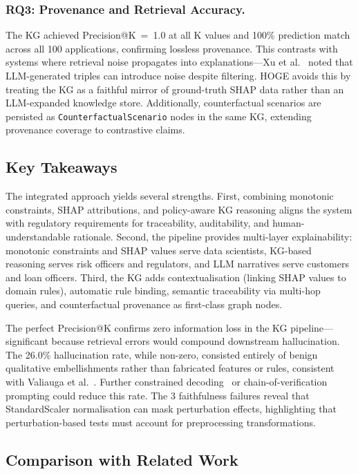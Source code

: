 \documentclass[lnbip]{svmultln}
\begin{document}
\subsubsection{RQ3: Provenance and Retrieval Accuracy.}
The KG achieved Precision@K~=~1.0 at all K values and 100\% prediction match across all 100 applications, confirming lossless provenance. This contrasts with systems where retrieval noise propagates into explanations---Xu et al.~\cite{synkg2025} noted that LLM-generated triples can introduce noise despite filtering. HOGE avoids this by treating the KG as a faithful mirror of ground-truth SHAP data rather than an LLM-expanded knowledge store. Additionally, counterfactual scenarios are persisted as \texttt{CounterfactualScenario} nodes in the same KG, extending provenance coverage to contrastive claims.

\subsection{Key Takeaways}
The integrated approach yields several strengths. First, combining monotonic constraints, SHAP attributions, and policy-aware KG reasoning aligns the system with regulatory requirements for traceability, auditability, and human-understandable rationale. Second, the pipeline provides multi-layer explainability: monotonic constraints and SHAP values serve data scientists, KG-based reasoning serves risk officers and regulators, and LLM narratives serve customers and loan officers. Third, the KG adds contextualisation (linking SHAP values to domain rules), automatic rule binding, semantic traceability via multi-hop queries, and counterfactual provenance as first-class graph nodes.

The perfect Precision@K confirms zero information loss in the KG pipeline---significant because retrieval errors would compound downstream hallucination. The 26.0\% hallucination rate, while non-zero, consisted entirely of benign qualitative embellishments rather than fabricated features or rules, consistent with Valiauga et al.~\cite{racds2026}. Further constrained decoding~\cite{depress2025} or chain-of-verification prompting could reduce this rate. The 3 faithfulness failures reveal that StandardScaler normalisation can mask perturbation effects, highlighting that perturbation-based tests must account for preprocessing transformations.

\subsection{Comparison with Related Work}
\end{document}
